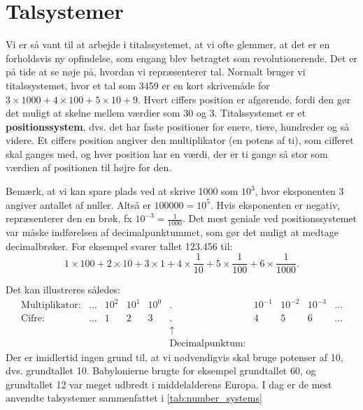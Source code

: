 \chapter{Talsystemer}
\label{chap:ch2}

Vi er så vant til at arbejde i titalssystemet, at vi ofte glemmer, at det er en forholdsvis ny opfindelse, som engang blev betragtet som revolutionerende. Det er på tide at se nøje på, hvordan vi repræsenterer tal. Normalt bruger vi titalssystemet, hvor et tal som 3459 er en kort skrivemåde for \(3 \times 1000 + 4 \times 100 + 5 \times 10 + 9\). Hvert ciffers position er afgørende, fordi den gør det muligt at skelne mellem værdier som 30 og 3. Titalssystemet er et\textbf{ positionssystem}, dvs. det har faste positioner for enere, tiere, hundreder og så videre. Et ciffers position angiver den multiplikator (en potens af ti), som cifferet skal ganges med, og hver position har en værdi, der er ti gange så stor som værdien af positionen til højre for den.

Bemærk, at vi kan spare plads ved at skrive 1000 som \(10^3\), hvor eksponenten 3 angiver antallet af nuller. Altså er \(100000 = 10^5\). Hvis eksponenten er negativ, repræsenterer den en brøk, fx \(10^{-3} = \frac{1}{1000}\). Det mest geniale ved positionssystemet var måske indførelsen af decimalpunktummet, som gør det muligt at medtage decimalbrøker. For eksempel svarer tallet 123.456 til:
\[
1 \times 100 + 2 \times 10 + 3 \times 1 + 4 \times \frac{1}{10} + 5 \times \frac{1}{100} + 6 \times \frac{1}{1000}.
\]

Det kan illustreres således:
\[
\begin{array}{rccccccccc}
\text{Multiplikator:} & \ldots & 10^2 & 10^1 & 10^0 & . & 10^{-1} & 10^{-2} & 10^{-3} & \ldots \\
\text{Cifre:} & \ldots & 1 & 2 & 3 & . & 4 & 5 & 6 &\ldots \\
& & & & & \uparrow & & & & \\
& & & & & \text{Decimalpunktum:} & & & &
\end{array}
\]
Der er imidlertid ingen grund til, at vi nødvendigvis skal bruge potenser af 10, dvs. grundtallet 10. Babylonierne brugte for eksempel grundtallet 60, og grundtallet 12 var meget udbredt i middelalderens Europa. I dag er de mest anvendte talsystemer sammenfattet i \autoref{tab:number_systems}

